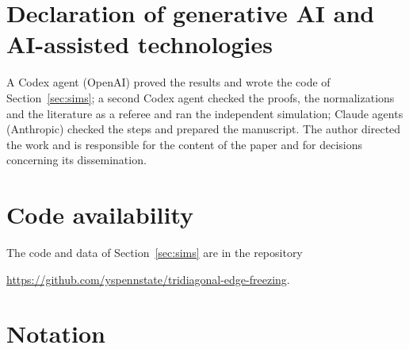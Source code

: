 \documentclass[11pt]{amsart}
\theoremstyle{remark}
\begin{document}
\section*{Declaration of generative AI and AI-assisted technologies}
A Codex agent (OpenAI) proved the results and wrote the code of Section~\ref{sec:sims}; a second Codex agent checked the
proofs, the normalizations and the literature as a referee and ran the independent simulation; Claude agents (Anthropic)
checked the steps and prepared the manuscript. The author directed the work and is responsible for the content of the
paper and for decisions concerning its dissemination.

\section*{Code availability}
The code and data of Section~\ref{sec:sims} are in the repository
\begin{center}\url{https://github.com/yspennstate/tridiagonal-edge-freezing}.\end{center}

\appendix
\section{Notation}\label{app:notation}
\end{document}

